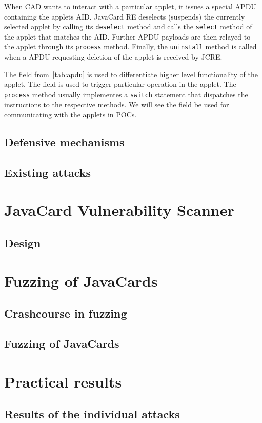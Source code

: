 \documentclass{../llncs/llncs}
\begin{document}
When CAD wants to interact with a particular applet, it issues a special APDU containing the applets AID. JavaCard RE deselects (suspends) the currently selected applet by calling its \texttt{deselect} method and calls the \texttt{select} method of the applet that matches the AID. Further APDU payloads are then relayed to the applet through its \texttt{process} method. Finally, the \texttt{uninstall} method is called when a APDU requesting deletion of the applet is received by JCRE.

    The \cla field from~\ref{tab:apdu} is used to differentiate higher level functionality of the applet. The \ins field is used to trigger particular operation in the applet. The \texttt{process} method usually implementes a \texttt{switch} statement that dispatches the \ins instructions to the respective methods. We will see the \ins field be used for communicating with the applets in POCs.

    \subsection{Defensive mechanisms}
    \subsection{Existing attacks}

\section{JavaCard Vulnerability Scanner}
    \subsection{Design}

\section{Fuzzing of JavaCards\label{sec:fuzzing}}
    \subsection{Crashcourse in fuzzing}
    \subsection{Fuzzing of JavaCards}

\section{Practical results}
    \subsection{Results of the individual attacks}
\end{document}
